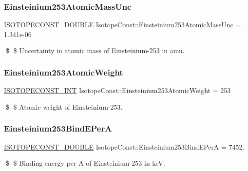 \subsubsection{\texorpdfstring{Einsteinium253\+Atomic\+Mass\+Unc}{Einsteinium253AtomicMassUnc}}
{\footnotesize\ttfamily \mbox{\hyperlink{group___isotope_const-_macros_ga8f45a7272ce02c0b4c65c44636ed719a}{I\+S\+O\+T\+O\+P\+E\+C\+O\+N\+S\+T\+\_\+\+D\+O\+U\+B\+LE}} Isotope\+Const\+::\+Einsteinium253\+Atomic\+Mass\+Unc = 1.\+341e-\/06}

\$ \$ Uncertainty in atomic mass of Einsteinium-\/253 in amu. \mbox{\label{group___isotope_const-_einsteinium-_es253_ga9b8d2456b139ffabb3b623b4fcdd83bc}} 
\subsubsection{\texorpdfstring{Einsteinium253\+Atomic\+Weight}{Einsteinium253AtomicWeight}}
{\footnotesize\ttfamily \mbox{\hyperlink{group___isotope_const-_macros_ga5f18360b3e99483a35c32d789e62621c}{I\+S\+O\+T\+O\+P\+E\+C\+O\+N\+S\+T\+\_\+\+I\+NT}} Isotope\+Const\+::\+Einsteinium253\+Atomic\+Weight = 253}

\$ \$ Atomic weight of Einsteinium-\/253. \mbox{\label{group___isotope_const-_einsteinium-_es253_gad83a1e32aa43e70a5a6603dd4252300c}} 
\subsubsection{\texorpdfstring{Einsteinium253\+Bind\+E\+PerA}{Einsteinium253BindEPerA}}
{\footnotesize\ttfamily \mbox{\hyperlink{group___isotope_const-_macros_ga8f45a7272ce02c0b4c65c44636ed719a}{I\+S\+O\+T\+O\+P\+E\+C\+O\+N\+S\+T\+\_\+\+D\+O\+U\+B\+LE}} Isotope\+Const\+::\+Einsteinium253\+Bind\+E\+PerA = 7452.}

\$ \$ Binding energy per A of Einsteinium-\/253 in keV. \mbox{\label{group___isotope_const-_einsteinium-_es253_ga35d8ed86ae9832c14c889d1639fec0d8}} 
